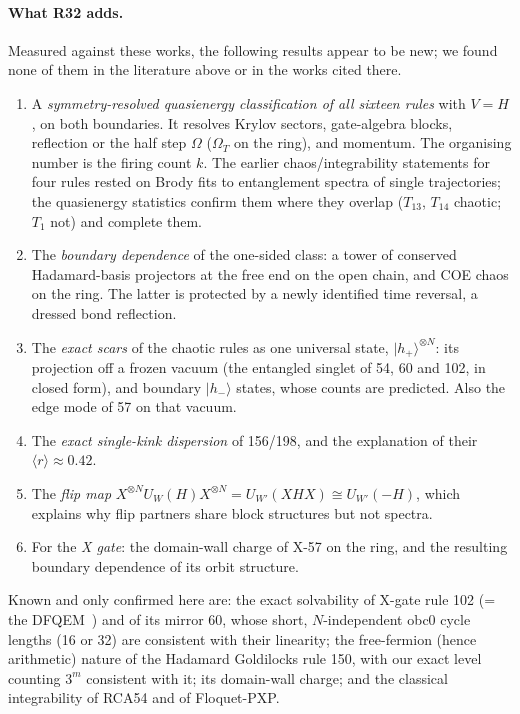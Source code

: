\paragraph{What R32 adds.} Measured against these works, the following results appear to be new; we found none of them
in the literature above or in the works cited there.
\begin{enumerate}
\item A \emph{symmetry-resolved quasienergy classification of all sixteen rules} with $V=H$, on both boundaries. It
  resolves Krylov sectors, gate-algebra blocks, reflection or the half step $\Omega$ ($\Omega_T$ on the ring), and
  momentum. The organising number is the firing count $k$. The earlier chaos/integrability statements for four rules
  rested on Brody fits to entanglement spectra of single trajectories; the quasienergy statistics confirm them where
  they overlap ($T_{13}$, $T_{14}$ chaotic; $T_1$ not) and complete them.
\item The \emph{boundary dependence} of the one-sided class: a tower of conserved Hadamard-basis projectors at the free
  end on the open chain, and COE chaos on the ring. The latter is protected by a newly identified time reversal, a
  dressed bond reflection.
\item The \emph{exact scars} of the chaotic rules as one universal state, $|h_+\rangle^{\otimes N}$: its projection off a
  frozen vacuum (the entangled singlet of 54, 60 and 102, in closed form), and boundary $|h_-\rangle$ states, whose
  counts are predicted. Also the edge mode of 57 on that vacuum.
\item The \emph{exact single-kink dispersion} of 156/198, and the explanation of their $\langle r\rangle\approx0.42$.
\item The \emph{flip map} $X^{\otimes N}U_W(H)X^{\otimes N}=U_{W'}(XHX)\cong U_{W'}(-H)$, which explains why flip
  partners share block structures but not spectra.
\item For the \emph{X gate}: the domain-wall charge of X-57 on the ring, and the resulting boundary dependence of its
  orbit structure.
\end{enumerate}
Known and only confirmed here are: the exact solvability of X-gate rule 102 (= the DFQEM~\cite{bertini2024det}) and of its mirror 60, whose short,
$N$-independent obc0 cycle lengths (16 or 32) are consistent with their linearity; the free-fermion (hence arithmetic) nature of the Hadamard Goldilocks rule 150, with
our exact level counting $3^m$ consistent with it; its domain-wall charge; and the classical integrability of RCA54 and of
Floquet-PXP.
